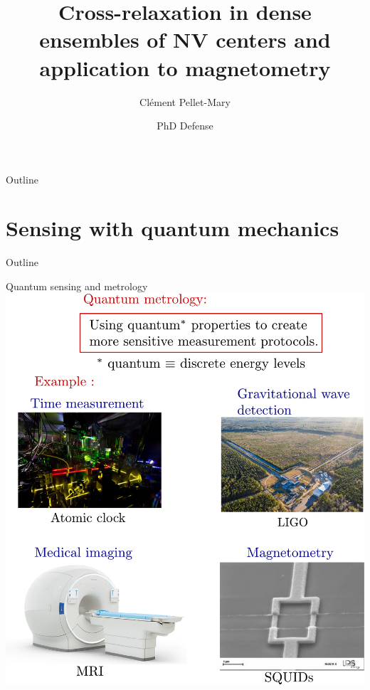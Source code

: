 \documentclass{beamer}
\title{Cross-relaxation in dense ensembles of NV centers and
application to magnetometry}
\author{Clément Pellet-Mary}
\date{PhD Defense}
\begin{document}
\begin{frame}
\maketitle
\end{frame}

\begin{frame}{Outline}
\tableofcontents
\end{frame}

\section{Sensing with quantum mechanics}
\begin{frame}{Outline}
\tableofcontents[currentsection]
\end{frame}

\begin{frame}{Quantum sensing and metrology}
\centering
\includegraphics[width=\textwidth,height=0.9\textheight,keepaspectratio]{Slide_quantum_metrology}
\end{frame}
\end{document}
